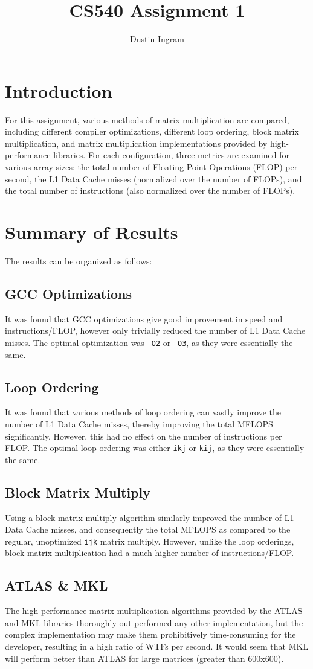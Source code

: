 \documentclass{article}
\title{CS540 Assignment 1}
\author{Dustin Ingram}
\begin{document}
\maketitle
\newpage
\section{Introduction}
For this assignment, various methods of matrix multiplication are compared, including different compiler optimizations, different loop ordering, block matrix multiplication, and matrix multiplication implementations provided by high-performance libraries. For each configuration, three metrics are examined for various array sizes: the total number of Floating Point Operations (FLOP) per second, the L1 Data Cache misses (normalized over the number of FLOPs), and the total number of instructions (also normalized over the number of FLOPs).
\section{Summary of Results}
The results can be organized as follows:
\subsection{GCC Optimizations}
It was found that GCC optimizations give good improvement in speed and instructions/FLOP, however only trivially reduced the number of L1 Data Cache misses. The optimal optimization was \texttt{-O2} or \texttt{-O3}, as they were essentially the same.
\subsection{Loop Ordering}
It was found that various methods of loop ordering can vastly improve the number of L1 Data Cache misses, thereby improving the total MFLOPS significantly. However, this had no effect on the number of instructions per FLOP. The optimal loop ordering was either \texttt{ikj} or \texttt{kij}, as they were essentially the same.
\subsection{Block Matrix Multiply}
Using a block matrix multiply algorithm similarly improved the number of L1 Data Cache misses, and consequently the total MFLOPS as compared to the regular, unoptimized \texttt{ijk} matrix multiply. However, unlike the loop orderings, block matrix multiplication had a much higher number of instructions/FLOP.
\subsection{ATLAS \& MKL}
The high-performance matrix multiplication algorithms provided by the ATLAS and MKL libraries thoroughly out-performed any other implementation, but the complex implementation may make them prohibitively time-consuming for the developer, resulting in a high ratio of WTFs per second. It would seem that MKL will perform better than ATLAS for large matrices (greater than 600x600).
\end{document}
